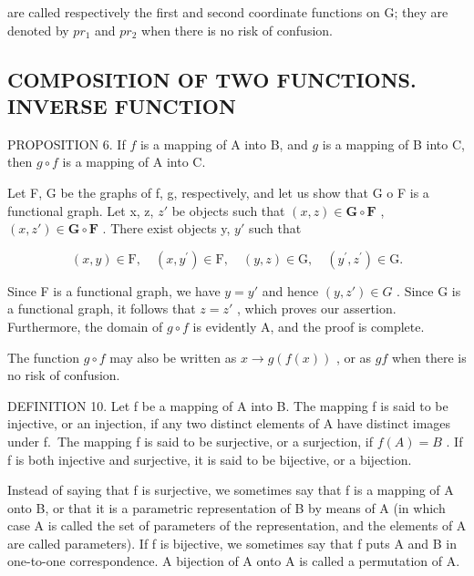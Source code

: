 are called respectively the first and second coordinate functions on G; they are denoted by \(pr_{1}\) and \(pr_{2}\) when there is no risk of confusion.

\subsection{COMPOSITION OF TWO FUNCTIONS. INVERSE FUNCTION}

PROPOSITION 6. If \(f\) is a mapping of A into B, and \(g\) is a mapping of B into C, then \(g \circ f\) is a mapping of A into C.

Let F, G be the graphs of f, g, respectively, and let us show that G o F is a functional graph. Let x, z, \(z'\) be objects such that \((x, z) \in \mathbf{G} \circ \mathbf{F}\) , \((x, z') \in \mathbf{G} \circ \mathbf{F}\) . There exist objects y, \(y'\) such that

\[
(x, y) \in \mathrm{F}, \quad (x, y ^ {\prime}) \in \mathrm{F}, \quad (y, z) \in \mathrm{G}, \quad (y ^ {\prime}, z ^ {\prime}) \in \mathrm{G}.
\]

Since F is a functional graph, we have \(y = y'\) and hence \((y, z') \in G\) . Since G is a functional graph, it follows that \(z = z'\) , which proves our assertion. Furthermore, the domain of \(g \circ f\) is evidently A, and the proof is complete.

The function \(g \circ f\) may also be written as \(x \to g(f(x))\) , or as \(gf\) when there is no risk of confusion.

DEFINITION 10. Let f be a mapping of A into B. The mapping f is said to be injective, or an injection, if any two distinct elements of A have distinct images under f.~The mapping f is said to be surjective, or a surjection, if \(f(A) = B\) . If f is both injective and surjective, it is said to be bijective, or a bijection.

Instead of saying that f is surjective, we sometimes say that f is a mapping of A onto B, or that it is a parametric representation of B by means of A (in which case A is called the set of parameters of the representation, and the elements of A are called parameters). If f is bijective, we sometimes say that f puts A and B in one-to-one correspondence. A bijection of A onto A is called a permutation of A.


